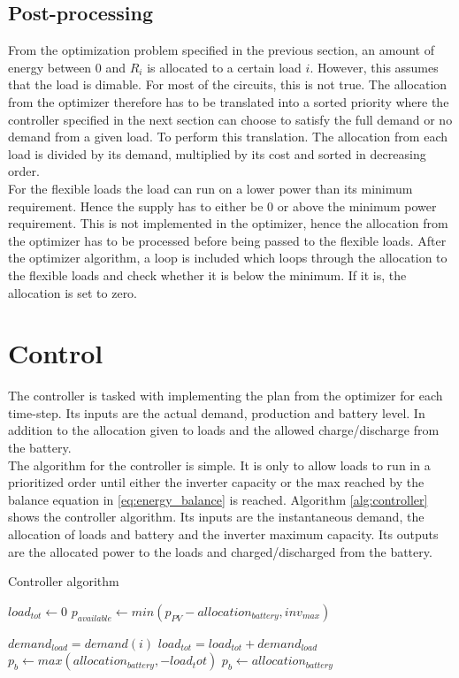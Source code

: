 \subsection{Post-processing}\label{sec:post_processing}
From the optimization problem specified in the previous section, an amount of energy between 0 and $R_i$ is allocated to a certain load $i$. However, this assumes that the load is dimable. For most of the circuits, this is not true. The allocation from the optimizer therefore has to be translated into a sorted priority where the controller specified in the next section can choose to satisfy the full demand or no demand from a given load. To perform this translation. The allocation from each load is divided by its demand, multiplied by its cost and sorted in decreasing order.\\ 

For the flexible loads the load can run on a lower power than its minimum requirement. Hence the supply has to either be 0 or above the minimum power requirement. This is not implemented in the optimizer, hence the allocation from the optimizer has to be processed before being passed to the flexible loads. After the optimizer algorithm, a loop is included which loops through the allocation to the flexible loads and check whether it is below the minimum. If it is, the allocation is set to zero.


\section{Control}

The controller is tasked with implementing the plan from the optimizer for each time-step. Its inputs are the actual demand, production and battery level. In addition to the allocation given to loads and the allowed charge/discharge from the battery.\\

The algorithm for the controller is simple. It is only to allow loads to run in a prioritized order until either the inverter capacity or the max reached by the balance equation in \ref{eq:energy_balance} is reached. Algorithm \ref{alg:controller} shows the controller algorithm. Its inputs are the instantaneous demand, the allocation of loads and battery and the inverter maximum capacity. Its outputs are the allocated power to the loads and charged/discharged from the battery.

\begin{algorithm}
\caption{Controller algorithm}\label{alg:controller}
\begin{algorithmic}
    \State$load_{tot}  \gets 0 $
    \State$p_{available}  \gets min(p_{PV} - allocation_{battery}, inv_{max}) $

        \State$demand_{load} = demand(i) $
            \State$load_{tot}  = load_{tot} + demand_{load}$
        \EndIf
    \EndFor
{}
    \State$p_{b} \gets max(allocation_{battery}, -load_tot)$
\Else
    \State$p_{b} \gets allocation_{battery}$
\EndIf 
\end{algorithmic}
\end{algorithm}

